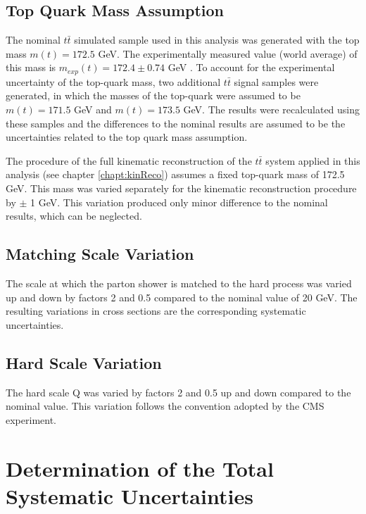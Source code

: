 \subsection{Top Quark Mass Assumption}

The nominal $t\bar{t}$ simulated sample used in this analysis was generated with the top mass $m(t) = 172.5$ GeV. The experimentally measured
value (world average) of this mass is $m_{exp}(t) = 172.4 \pm 0.74$ GeV \cite{ATLAS:2014wva}. To account for the experimental uncertainty of the top-quark
mass, two additional $t\bar{t}$ signal samples were generated, in which the masses of the top-quark were assumed to be $m(t) = 171.5$ GeV and
$m(t) = 173.5$ GeV. The results were recalculated using these samples and the differences to the nominal results are assumed to
be the uncertainties related to the top quark mass assumption.

The procedure of the full kinematic reconstruction of the $t\bar{t}$ system applied in this analysis (see chapter \ref{chapt:kinReco})
assumes a fixed top-quark mass of 172.5 GeV. This mass was varied separately for the kinematic reconstruction procedure by $\pm$ 1 GeV. 
This variation produced only minor difference to the nominal results, which can be neglected.

\subsection{Matching Scale Variation}\label{ssec:matchS_sys}

The scale at which the parton shower is matched to the hard process was varied up and down by factors 2 and 0.5 compared to the nominal
value of 20 GeV. The resulting variations in cross sections are the corresponding systematic uncertainties.

\subsection{Hard Scale Variation}\label{ssec:hardS_sys}

The hard scale Q was varied by factors
2 and 0.5 up and down compared to the nominal value. This variation follows the convention 
adopted by the CMS experiment.

\section{Determination of the Total Systematic Uncertainties}\label{sec:syst_det}

